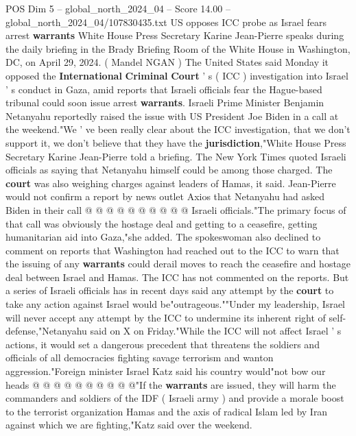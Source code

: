 \begin{textsample}{POS Dim 5 – global\_north\_2024\_04 – Score 14.00 – global\_north\_2024\_04/107830435.txt}  \label{ex:f5_pos_286}
US opposes ICC probe as Israel fears arrest \textbf{warrants} White House Press Secretary Karine Jean-Pierre speaks during the daily briefing in the Brady Briefing Room of the White House in Washington, DC, on April 29, 2024. ( Mandel NGAN ) The United States said Monday it opposed the \textbf{International} \textbf{Criminal} \textbf{Court} ' s ( ICC ) investigation into Israel ' s conduct in Gaza, amid reports that Israeli officials fear the Hague-based tribunal could soon issue arrest \textbf{warrants}.
Israeli Prime Minister Benjamin Netanyahu reportedly raised the issue with US President Joe Biden in a call at the weekend."We ' ve been really clear about the ICC investigation, that we don't support it, we don't believe that they have the \textbf{jurisdiction},"White House Press Secretary Karine Jean-Pierre told a briefing.
The New York Times quoted Israeli officials as saying that Netanyahu himself could be among those charged.
The \textbf{court} was also weighing charges against leaders of Hamas, it said.
Jean-Pierre would not confirm a report by news outlet Axios that Netanyahu had asked Biden in their call @ @ @ @ @ @ @ @ @ @ Israeli officials."The primary focus of that call was obviously the hostage deal and getting to a ceasefire, getting humanitarian aid into Gaza,"she added.
The spokeswoman also declined to comment on reports that Washington had reached out to the ICC to warn that the issuing of any \textbf{warrants} could derail moves to reach the ceasefire and hostage deal between Israel and Hamas.
The ICC has not commented on the reports.
But a series of Israeli officials has in recent days said any attempt by the \textbf{court} to take any action against Israel would be"outrageous.""Under my leadership, Israel will never accept any attempt by the ICC to undermine its inherent right of self-defense,"Netanyahu said on X on Friday."While the ICC will not affect Israel ' s actions, it would set a dangerous precedent that threatens the soldiers and officials of all democracies fighting savage terrorism and wanton aggression."Foreign minister Israel Katz said his country would"not bow our heads @ @ @ @ @ @ @ @ @ @"If the \textbf{warrants} are issued, they will harm the commanders and soldiers of the IDF ( Israeli army ) and provide a morale boost to the terrorist organization Hamas and the axis of radical Islam led by Iran against which we are fighting,"Katz said over the weekend.

\end{textsample}
